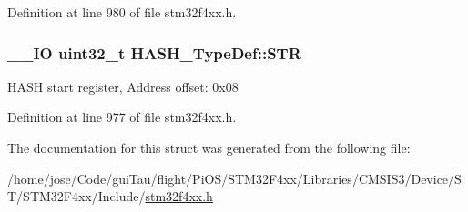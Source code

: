 Definition at line 980 of file stm32f4xx.\-h.

\hypertarget{struct_h_a_s_h___type_def_a4b07bc8eb36129062d3f331921316d66}{
\subsubsection[{S\-T\-R}]{\setlength{\rightskip}{0pt plus 5cm}\-\_\-\-\_\-\-I\-O {\bf uint32\-\_\-t} H\-A\-S\-H\-\_\-\-Type\-Def\-::\-S\-T\-R}}\label{struct_h_a_s_h___type_def_a4b07bc8eb36129062d3f331921316d66}
H\-A\-S\-H start register, Address offset\-: 0x08 

Definition at line 977 of file stm32f4xx.\-h.



The documentation for this struct was generated from the following file\-:\begin{DoxyCompactItemize}
\item 
/home/jose/\-Code/gui\-Tau/flight/\-Pi\-O\-S/\-S\-T\-M32\-F4xx/\-Libraries/\-C\-M\-S\-I\-S3/\-Device/\-S\-T/\-S\-T\-M32\-F4xx/\-Include/\hyperlink{stm32f4xx_8h}{stm32f4xx.\-h}\end{DoxyCompactItemize}
